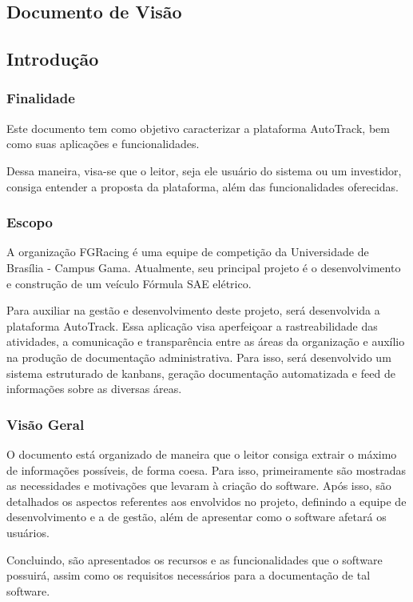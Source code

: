 \begin{apendicesenv}

\partapendices

\chapter{Documento de Visão}
\section{Introdução}
\subsection{Finalidade}
Este documento tem como objetivo caracterizar a plataforma AutoTrack, bem como suas aplicações e funcionalidades.

Dessa maneira, visa-se que o leitor, seja ele usuário do sistema ou um investidor, consiga entender a proposta da plataforma, além das funcionalidades oferecidas.

\subsection{Escopo}
A organização FGRacing é uma equipe de competição da Universidade de Brasília - Campus Gama. Atualmente, seu principal projeto é o desenvolvimento e construção de um veículo Fórmula SAE elétrico.

Para auxiliar na gestão e desenvolvimento deste projeto, será desenvolvida a plataforma AutoTrack. Essa aplicação visa aperfeiçoar a rastreabilidade das atividades, a comunicação e transparência entre as áreas da organização e auxílio na produção de documentação administrativa. Para isso, será desenvolvido um sistema estruturado de kanbans, geração documentação automatizada e feed de informações sobre as diversas áreas.


\subsection{Visão Geral}
O documento está organizado de maneira que o leitor consiga extrair o máximo de informações possíveis, de forma coesa. Para isso, primeiramente são mostradas as necessidades e motivações que levaram à criação do software. Após isso, são detalhados os aspectos referentes aos envolvidos no projeto, definindo a equipe de desenvolvimento e a de gestão, além de apresentar como o software afetará os usuários.

Concluindo, são apresentados os recursos e as funcionalidades que o software possuirá, assim como os requisitos necessários para a documentação de tal software.


\end{apendicesenv}
